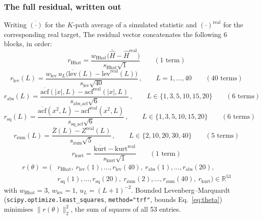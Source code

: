 \documentclass[11pt]{article}
\begin{document}
\subsubsection{The full residual, written out}
Writing $\overline{(\cdot)}$ for the $K$-path average of a simulated
statistic and $(\cdot)^{\text{real}}$ for the corresponding real target,
The residual vector concatenates the following 6 blocks, in order:
\begin{equation}
r_{\text{Hhat}} = \frac{w_{\text{Hhat}}\big(\overline{\hat H}-\hat H^{\text{real}}\big)}
{s_{\text{Hhat}}\sqrt{1}}\qquad(1\text{ term})
\label{eq:rhurst}
\end{equation}
\begin{equation}
r_{\text{lev}}(L) = \frac{w_{\text{lev}}\,u_L\big(\overline{\text{lev}}(L)-\text{lev}^{\text{real}}(L)\big)}
{s_{\text{lev}}\sqrt{40}}\, ,\qquad L=1,\dots,40\qquad(40\text{ terms})
\label{eq:rlev}
\end{equation}
\begin{equation}
r_{\text{abs}}(L) = \frac{\overline{\text{acf}}(|x|,L)-\text{acf}^{\text{real}}(|x|,L)}
{s_{\text{abs\_acf}}\sqrt6}\, ,\qquad L\in\{1,3,5,10,15,20\}\qquad(6\text{ terms})
\label{eq:rabs}
\end{equation}
\begin{equation}
r_{\text{sq}}(L) = \frac{\overline{\text{acf}}(x^2,L)-\text{acf}^{\text{real}}(x^2,L)}
{s_{\text{sq\_acf}}\sqrt6}\, ,\qquad L\in\{1,3,5,10,15,20\}\qquad(6\text{ terms})
\label{eq:rsq}
\end{equation}
\begin{equation}
r_{\text{zum}}(L) = \frac{\overline Z(L)-Z^{\text{real}}(L)}{s_{\text{zum}}\sqrt5}\, ,\qquad
L\in\{2,10,20,30,40\}\qquad(5\text{ terms})
\label{eq:rzum}
\end{equation}
\begin{equation}
r_{\text{kurt}} = \frac{\overline{\text{kurt}}-\text{kurt}^{\text{real}}}{s_{\text{kurt}}\sqrt1}
\qquad(1\text{ term})
\label{eq:rkurt}
\end{equation}
\begin{equation}
\begin{split}
r(\theta) = \big(&r_{\text{Hhat}},\ r_{\text{lev}}(1),\dots,r_{\text{lev}}(40),\
r_{\text{abs}}(1),\dots,r_{\text{abs}}(20),\\
&r_{\text{sq}}(1),\dots,r_{\text{sq}}(20),\
r_{\text{zum}}(2),\dots,r_{\text{zum}}(40),\ r_{\text{kurt}}\big)\in\mathbb R^{53}
\end{split}
\label{eq:rfull}
\end{equation}
with $w_{\text{Hhat}}=3$, $w_{\text{lev}}=1$, $u_L=(L+1)^{-2}$. Bounded
Levenberg--Marquardt (\texttt{scipy.optimize.least\_squares},
\texttt{method="trf"}, bounds Eq.~\ref{eq:theta}) minimises
$\lVert r(\theta)\rVert_2^2$, the sum of squares of all 53 entries.
\end{document}
